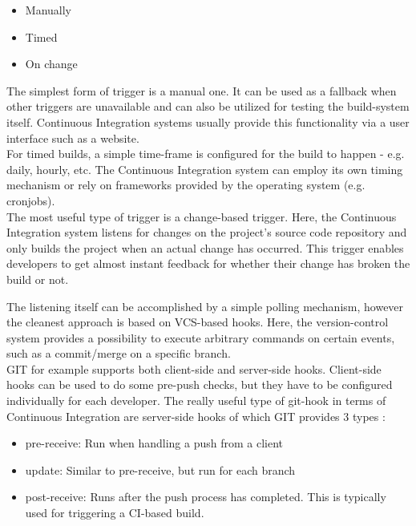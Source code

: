 \begin{itemize}
    \item Manually
    \item Timed
    \item On change
\end{itemize}

The simplest form of trigger is a manual one. It can be used as a fallback when
other triggers are unavailable and can also be utilized for testing the
build-system itself. Continuous Integration systems usually provide this
functionality via a user interface such as a website.\\

For timed builds, a simple time-frame is configured for the build to happen -
e.g. daily, hourly, etc. The Continuous Integration system can employ its own
timing mechanism or rely on frameworks provided by the operating system (e.g.
cronjobs).\\

The most useful type of trigger is a change-based trigger. Here, the Continuous
Integration system listens for changes on the project's source code repository
and only builds the project when an actual change has occurred. This trigger
enables developers to get almost instant feedback for whether their change has
broken the build or not.

The listening itself can be accomplished by a simple polling mechanism, however
the cleanest approach is based on VCS-based hooks. Here, the version-control
system provides a possibility to execute arbitrary commands on certain events,
such as a commit/merge on a specific branch.\\

GIT for example supports both client-side and server-side hooks. Client-side
hooks can be used to do some pre-push checks, but they have to be configured
individually for each developer. The really useful type of git-hook in terms of
Continuous Integration are server-side hooks of which GIT provides 3 types
\cite{chacon:2009}:

\begin{itemize}
    \item pre-receive: Run when handling a push from a client
    \item update: Similar to pre-receive, but run for each branch
    \item post-receive: Runs after the push process has completed. This is
        typically used for triggering a CI-based build.
\end{itemize}

